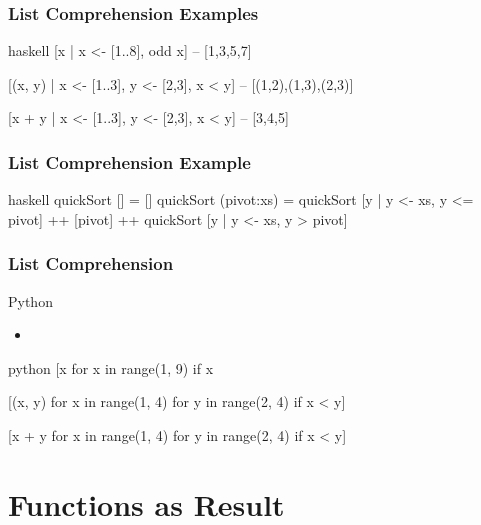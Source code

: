 \documentclass[dvipsnames]{beamer}
\theoremstyle{plain}
\begin{document}
\begin{frame}[fragile]
  \frametitle{List Comprehension Examples}

  \begin{example}[Haskell]
    \begin{pygments}{haskell}
[x | x <- [1..8], odd x]
-- [1,3,5,7]

[(x, y) | x <- [1..3], y <- [2,3], x < y]
-- [(1,2),(1,3),(2,3)]

[x + y | x <- [1..3], y <- [2,3], x < y]
-- [3,4,5]
    \end{pygments}
  \end{example}
\end{frame}

\begin{frame}[fragile]
  \frametitle{List Comprehension Example}

  \begin{example}
    \begin{pygments}{haskell}
quickSort [] = []
quickSort (pivot:xs) =
    quickSort [y | y <- xs, y <= pivot]
    ++ [pivot]
    ++ quickSort [y | y <- xs, y > pivot]
    \end{pygments}
  \end{example}
\end{frame}

\begin{frame}[fragile]
  \frametitle{List Comprehension}

  \begin{block}{Python}
    \begin{itemize}
      \item {}
    \end{itemize}
  \end{block}

  \begin{example}
    \begin{pygments}{python}
[x for x in range(1, 9) if x %

[(x, y) for x in range(1, 4) for y in range(2, 4) if x < y]

[x + y for x in range(1, 4) for y in range(2, 4) if x < y]
    \end{pygments}
  \end{example}
\end{frame}

\section{Functions as Result}
\end{document}
